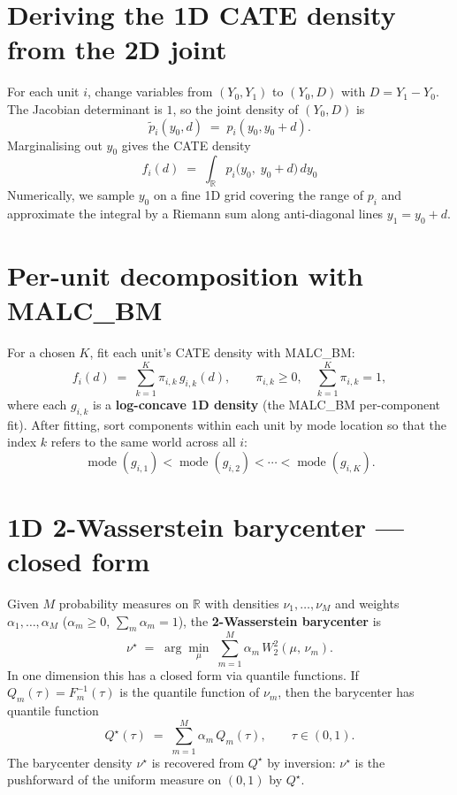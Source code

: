 \documentclass[11pt]{article}
\newcommand{\R}{\mathbb{R}}
\newcommand{\W}{W}
\begin{document}
\section{Deriving the 1D CATE density from the 2D joint}

For each unit $i$, change variables from $(Y_0, Y_1)$ to $(Y_0, D)$ with $D = Y_1 - Y_0$. The Jacobian determinant is $1$, so the joint density of $(Y_0, D)$ is
\[
  \tilde p_i(y_0, d) \;=\; p_i(y_0, y_0 + d).
\]
Marginalising out $y_0$ gives the CATE density
\begin{equation}
  \boxed{\;f_i(d) \;=\; \int_{\R} p_i\!\bigl(y_0,\; y_0 + d\bigr)\, dy_0\;}
  \label{eq:cate-density}
\end{equation}
Numerically, we sample $y_0$ on a fine 1D grid covering the range of $p_i$ and approximate the integral by a Riemann sum along anti-diagonal lines $y_1 = y_0 + d$.

\section{Per-unit decomposition with MALC\_BM}

For a chosen $K$, fit each unit's CATE density with MALC\_BM:
\begin{equation}
  f_i(d) \;=\; \sum_{k=1}^{K} \pi_{i,k}\, g_{i,k}(d),
  \qquad \pi_{i,k}\ge 0, \quad \sum_{k=1}^{K}\pi_{i,k} = 1,
  \label{eq:decomp}
\end{equation}
where each $g_{i,k}$ is a \textbf{log-concave 1D density} (the MALC\_BM per-component fit). After fitting, sort components within each unit by mode location so that the index $k$ refers to the same world across all $i$:
\[
  \operatorname{mode}(g_{i,1}) < \operatorname{mode}(g_{i,2}) < \cdots < \operatorname{mode}(g_{i,K}).
\]

\section{1D 2-Wasserstein barycenter --- closed form}

Given $M$ probability measures on $\R$ with densities $\nu_1, \dots, \nu_M$ and weights $\alpha_1, \dots, \alpha_M$ ($\alpha_m \ge 0$, $\sum_m \alpha_m = 1$), the \textbf{2-Wasserstein barycenter} is
\[
  \nu^\star \;=\; \arg\min_{\mu} \;\sum_{m=1}^{M} \alpha_m\, \W_2^2(\mu,\, \nu_m).
\]
In one dimension this has a closed form via quantile functions. If $Q_m(\tau) = F_m^{-1}(\tau)$ is the quantile function of $\nu_m$, then the barycenter has quantile function
\begin{equation}
  \boxed{\;Q^\star(\tau) \;=\; \sum_{m=1}^{M} \alpha_m\, Q_m(\tau), \qquad \tau \in (0, 1).\;}
  \label{eq:bary-1d}
\end{equation}
The barycenter density $\nu^\star$ is recovered from $Q^\star$ by inversion: $\nu^\star$ is the pushforward of the uniform measure on $(0,1)$ by $Q^\star$.
\end{document}
